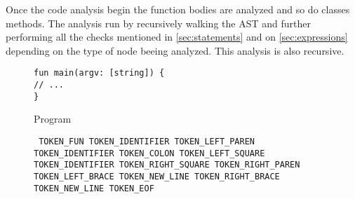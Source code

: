 Once the code analysis begin the function bodies are analyzed and so do classes methods. The analysis run by recursively walking the AST and further performing
all the checks mentioned in \autoref{sec:statements} and on \autoref{sec:expressions} depending on the type of node beeing analyzed.
This analysis is also recursive.

\begin{figure}[H]
	\centering
	\begin{subtable}{0.45\textwidth}
        \texttt{fun main(argv: [string]) \{\\\tab// ...\\\}}
		\caption{Program}
	\end{subtable}
	\begin{subtable}{0.45\textwidth}
		\centering
        \texttt{
            TOKEN\_FUN TOKEN\_IDENTIFIER TOKEN\_LEFT\_PAREN TOKEN\_IDENTIFIER TOKEN\_COLON TOKEN\_LEFT\_SQUARE TOKEN\_IDENTIFIER
            TOKEN\_RIGHT\_SQUARE TOKEN\_RIGHT\_PAREN TOKEN\_LEFT\_BRACE TOKEN\_NEW\_LINE
            TOKEN\_RIGHT\_BRACE TOKEN\_NEW\_LINE
            TOKEN\_EOF
        }
		\caption{List of tokens}
	\end{subtable}
    \begin{subfigure}{0.45\textwidth}
		\centering
\end{subfigure}
\end{figure}
